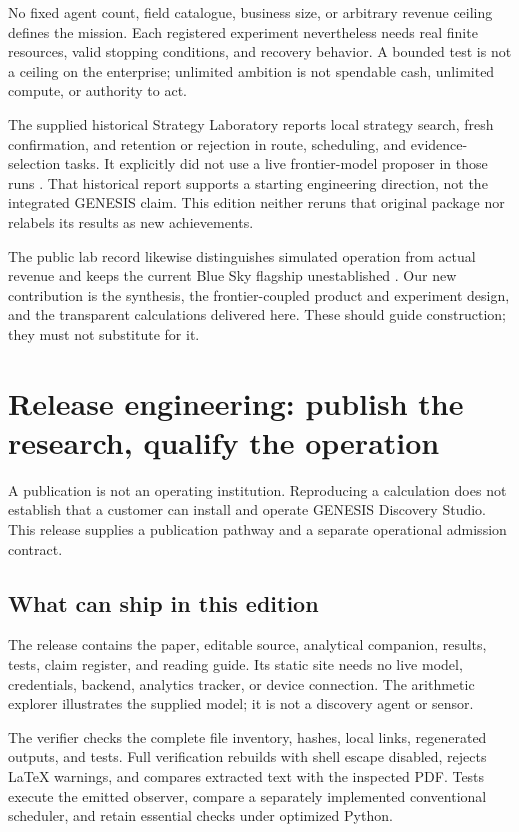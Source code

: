 \documentclass[11pt,letterpaper]{article}
\theoremstyle{remark}\newtheorem{remark}{Remark}[section]
\begin{document}
No fixed agent count, field catalogue, business size, or arbitrary revenue ceiling defines the mission. Each registered experiment nevertheless needs real finite resources, valid stopping conditions, and recovery behavior. A bounded test is not a ceiling on the enterprise; unlimited ambition is not spendable cash, unlimited compute, or authority to act.

The supplied historical Strategy Laboratory reports local strategy search, fresh confirmation, and retention or rejection in route, scheduling, and evidence-selection tasks. It explicitly did not use a live frontier-model proposer in those runs \citep{notes18}. That historical report supports a starting engineering direction, not the integrated GENESIS claim. This edition neither reruns that original package nor relabels its results as new achievements.

The public lab record likewise distinguishes simulated operation from actual revenue and keeps the current Blue Sky flagship unestablished \citep{labreadme}. Our new contribution is the synthesis, the frontier-coupled product and experiment design, and the transparent calculations delivered here. These should guide construction; they must not substitute for it.


\section{Release engineering: publish the research, qualify the operation}
\label{sec:release}
A publication is not an operating institution. Reproducing a calculation does not establish that a customer can install and operate GENESIS Discovery Studio. This release supplies a publication pathway and a separate operational admission contract.

\subsection{What can ship in this edition}
The release contains the paper, editable source, analytical companion, results, tests, claim register, and reading guide. Its static site needs no live model, credentials, backend, analytics tracker, or device connection. The arithmetic explorer illustrates the supplied model; it is not a discovery agent or sensor.

The verifier checks the complete file inventory, hashes, local links, regenerated outputs, and tests. Full verification rebuilds with shell escape disabled, rejects LaTeX warnings, and compares extracted text with the inspected PDF. Tests execute the emitted observer, compare a separately implemented conventional scheduler, and retain essential checks under optimized Python.
\end{document}

